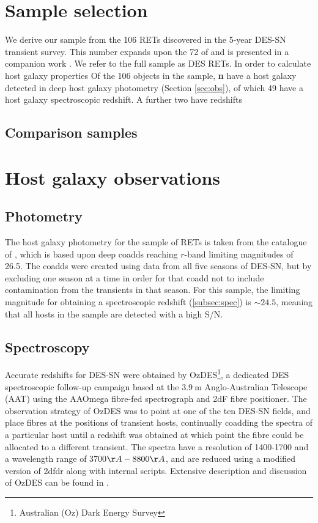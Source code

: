 \documentclass[fleqn,usenatbib,]{mnras}
\begin{document}
\section{Sample selection\label{sec:sample}}

We derive our sample from the 106 RETs discovered in the 5-year DES-SN transient survey. This number expands upon the 72 of  and is presented in a companion work . We refer to the full sample as DES RETs. In order to calculate host galaxy properties Of the 106 objects in the sample, \textbf{n} have a host galaxy detected in deep host galaxy photometry (Section \ref{sec:obs}), of which 49 have a host galaxy spectroscopic redshift. A further two have redshifts 

\subsection{Comparison samples \label{subsec:comparison}}


\section{Host galaxy observations \label{sec:obs}}
\subsection{Photometry \label{subsec:phot}}

The host galaxy photometry for the sample of RETs is taken from the catalogue of \citet{Wiseman2020}, which is based upon deep coadds reaching $r$-band limiting magnitudes of 26.5. The coadds were created using data from all five seasons of DES-SN, but by excluding one season at a time in order for that coadd not to include contamination from the transients in that season. For this sample, the limiting magnitude for obtaining a spectroscopic redshift (\ref{subsec:spec}) is $\sim 24.5$, meaning that all hosts in the sample are detected with a high S/N.

\subsection{Spectroscopy \label{subsec:spec}}
Accurate redshifts for DES-SN were obtained by OzDES\footnote{Australian (Oz) Dark Energy Survey}, a dedicated DES spectroscopic follow-up campaign based at the $3.9~\textrm{m}$ Anglo-Australian Telescope (AAT) using the AAOmega fibre-fed spectrograph and 2dF fibre positioner. The observation strategy of OzDES was to point at one of the ten DES-SN fields, and place fibres at the positions of transient hosts, continually coadding the spectra of a particular host until a redshift was obtained at which point the fibre could be allocated to a different transient. The spectra have a resolution of 1400-1700 and a wavelength range of 3700$\AA - 8800\AA$, and are reduced using a modified version of 2dfdr \citep{Croom2004} along with internal scripts. Extensive description and discussion of OzDES can be found in \citet{Yuan2015,Childress2017,Lidman2020}.
\end{document}
